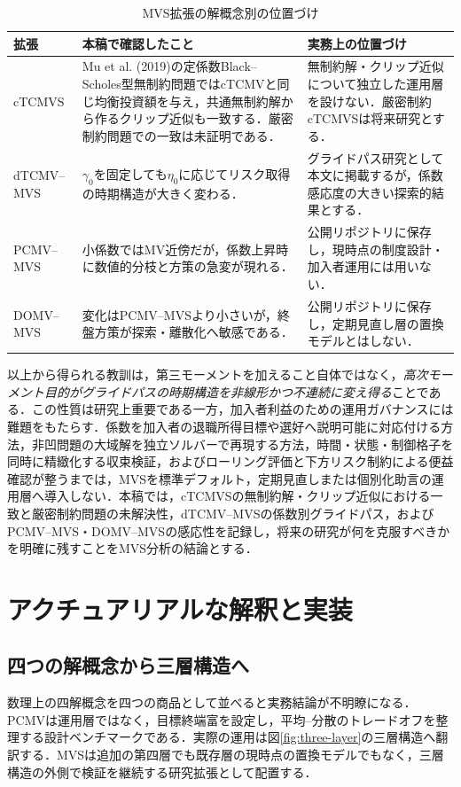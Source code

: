 \documentclass[10pt,a4paper]{article}
\theoremstyle{plain}
\theoremstyle{definition}
\begin{document}
\begin{table}[H]
\centering\small
\caption{MVS拡張の解概念別の位置づけ}
\label{tab:mvs-positioning}
\begin{tabularx}{\textwidth}{p{25mm}p{48mm}X}
\toprule
拡張 & 本稿で確認したこと & 実務上の位置づけ \\
\midrule
cTCMVS
& Mu et al. (2019)の定係数Black--Scholes型無制約問題ではcTCMVと同じ均衡投資額を与え，共通無制約解から作るクリップ近似も一致する．厳密制約問題での一致は未証明である．
& 無制約解・クリップ近似について独立した運用層を設けない．厳密制約cTCMVSは将来研究とする．\\
dTCMV--MVS
& $\gamma_0$を固定しても$\eta_0$に応じてリスク取得の時期構造が大きく変わる．
& グライドパス研究として本文に掲載するが，係数感応度の大きい探索的結果とする．\\
PCMV--MVS
& 小係数ではMV近傍だが，係数上昇時に数値的分枝と方策の急変が現れる．
& 公開リポジトリに保存し，現時点の制度設計・加入者運用には用いない．\\
DOMV--MVS
& 変化はPCMV--MVSより小さいが，終盤方策が探索・離散化へ敏感である．
& 公開リポジトリに保存し，定期見直し層の置換モデルとはしない．\\
\bottomrule
\end{tabularx}
\end{table}

以上から得られる教訓は，第三モーメントを加えること自体ではなく，\emph{高次モーメント目的がグライドパスの時期構造を非線形かつ不連続に変え得る}ことである．この性質は研究上重要である一方，加入者利益のための運用ガバナンスには難題をもたらす．係数を加入者の退職所得目標や選好へ説明可能に対応付ける方法，非凹問題の大域解を独立ソルバーで再現する方法，時間・状態・制御格子を同時に精緻化する収束検証，およびローリング評価と下方リスク制約による便益確認が整うまでは，MVSを標準デフォルト，定期見直しまたは個別化助言の運用層へ導入しない．本稿では，cTCMVSの無制約解・クリップ近似における一致と厳密制約問題の未解決性，dTCMV--MVSの係数別グライドパス，およびPCMV--MVS・DOMV--MVSの感応性を記録し，将来の研究が何を克服すべきかを明確に残すことをMVS分析の結論とする．

\section{アクチュアリアルな解釈と実装}\label{sec:implementation}

\subsection{四つの解概念から三層構造へ}
数理上の四解概念を四つの商品として並べると実務結論が不明瞭になる．PCMVは運用層ではなく，目標終端富を設定し，平均--分散のトレードオフを整理する設計ベンチマークである．実際の運用は図\ref{fig:three-layer}の三層構造へ翻訳する．MVSは追加の第四層でも既存層の現時点の置換モデルでもなく，三層構造の外側で検証を継続する研究拡張として配置する．
\end{document}
